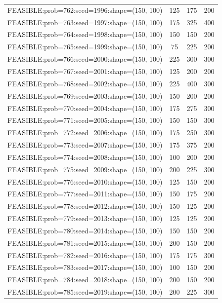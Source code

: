 \begin{longtable}{lccc}
FEASIBLE:prob=762:seed=1996:shape=(150, 100) &  125 &   175 &    200 \\
FEASIBLE:prob=763:seed=1997:shape=(150, 100) &  175 &   325 &    400 \\
FEASIBLE:prob=764:seed=1998:shape=(150, 100) &  150 &   150 &    200 \\
FEASIBLE:prob=765:seed=1999:shape=(150, 100) &   75 &   225 &    200 \\
FEASIBLE:prob=766:seed=2000:shape=(150, 100) &  225 &   300 &    300 \\
FEASIBLE:prob=767:seed=2001:shape=(150, 100) &  125 &   200 &    200 \\
FEASIBLE:prob=768:seed=2002:shape=(150, 100) &  225 &   400 &    300 \\
FEASIBLE:prob=769:seed=2003:shape=(150, 100) &  150 &   200 &    200 \\
FEASIBLE:prob=770:seed=2004:shape=(150, 100) &  175 &   275 &    300 \\
FEASIBLE:prob=771:seed=2005:shape=(150, 100) &  150 &   150 &    300 \\
FEASIBLE:prob=772:seed=2006:shape=(150, 100) &  175 &   250 &    300 \\
FEASIBLE:prob=773:seed=2007:shape=(150, 100) &  175 &   375 &    200 \\
FEASIBLE:prob=774:seed=2008:shape=(150, 100) &  100 &   200 &    200 \\
FEASIBLE:prob=775:seed=2009:shape=(150, 100) &  200 &   225 &    300 \\
FEASIBLE:prob=776:seed=2010:shape=(150, 100) &  125 &   150 &    200 \\
FEASIBLE:prob=777:seed=2011:shape=(150, 100) &  150 &   175 &    200 \\
FEASIBLE:prob=778:seed=2012:shape=(150, 100) &  150 &   125 &    200 \\
FEASIBLE:prob=779:seed=2013:shape=(150, 100) &  125 &   125 &    200 \\
FEASIBLE:prob=780:seed=2014:shape=(150, 100) &  150 &   150 &    200 \\
FEASIBLE:prob=781:seed=2015:shape=(150, 100) &  200 &   150 &    200 \\
FEASIBLE:prob=782:seed=2016:shape=(150, 100) &  175 &   175 &    300 \\
FEASIBLE:prob=783:seed=2017:shape=(150, 100) &  100 &   150 &    200 \\
FEASIBLE:prob=784:seed=2018:shape=(150, 100) &  200 &   150 &    200 \\
FEASIBLE:prob=785:seed=2019:shape=(150, 100) &  200 &   225 &    300 \\

\end{longtable}
